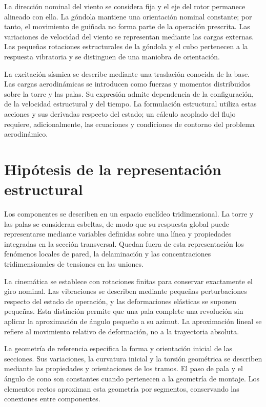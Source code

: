 \documentclass[11pt,a4paper,oneside]{report}
\begin{document}
La dirección nominal del viento se considera fija y el eje del rotor permanece alineado con ella. La góndola mantiene una orientación nominal constante; por tanto, el movimiento de guiñada no forma parte de la operación prescrita. Las variaciones de velocidad del viento se representan mediante las cargas externas. Las pequeñas rotaciones estructurales de la góndola y el cubo pertenecen a la respuesta vibratoria y se distinguen de una maniobra de orientación.

La excitación sísmica se describe mediante una traslación conocida de la base. Las cargas aerodinámicas se introducen como fuerzas y momentos distribuidos sobre la torre y las palas. Su expresión admite dependencia de la configuración, de la velocidad estructural y del tiempo. La formulación estructural utiliza estas acciones y sus derivadas respecto del estado; un cálculo acoplado del flujo requiere, adicionalmente, las ecuaciones y condiciones de contorno del problema aerodinámico.

\section{Hipótesis de la representación estructural}
Los componentes se describen en un espacio euclídeo tridimensional. La torre y las palas se consideran esbeltas, de modo que su respuesta global puede representarse mediante variables definidas sobre una línea y propiedades integradas en la sección transversal. Quedan fuera de esta representación los fenómenos locales de pared, la delaminación y las concentraciones tridimensionales de tensiones en las uniones.

La cinemática se establece con rotaciones finitas para conservar exactamente el giro nominal. Las vibraciones se describen mediante pequeñas perturbaciones respecto del estado de operación, y las deformaciones elásticas se suponen pequeñas. Esta distinción permite que una pala complete una revolución sin aplicar la aproximación de ángulo pequeño a su azimut. La aproximación lineal se refiere al movimiento relativo de deformación, no a la trayectoria absoluta.

La geometría de referencia especifica la forma y orientación inicial de las secciones. Sus variaciones, la curvatura inicial y la torsión geométrica se describen mediante las propiedades y orientaciones de los tramos. El paso de pala y el ángulo de cono son constantes cuando pertenecen a la geometría de montaje. Los elementos rectos aproximan esta geometría por segmentos, conservando las conexiones entre componentes.
\end{document}
